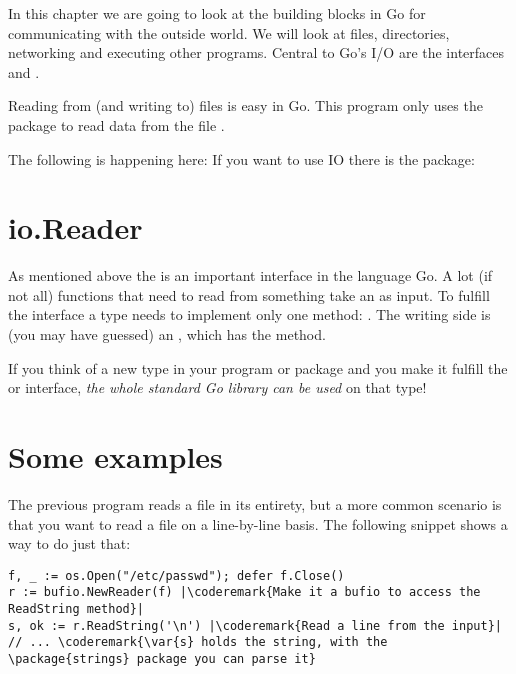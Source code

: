 \noindent{}In this chapter we are going to look at the building blocks in Go for 
communicating with the outside world. We will look at files, directories, networking
and executing other programs. Central to Go's I/O are the interfaces 
and .

Reading from (and writing to) files is easy in Go. This program
only uses the  package to read data from the file .

The following is happening here:
\showremarks
If you want to use  IO there is the
 package:

\showremarks

\section{io.Reader}
As mentioned above the  is an important interface in the language Go. A lot
(if not all) functions that need to read from something take an 
as input. To fulfill the interface a type needs to implement only one method: . The writing side is (you may have guessed) an , which has
the  method.

If you think of a new type in your program or package and you make it fulfill the 
or  interface, \emph{the whole standard Go library can be used} on that type!

\section{Some examples}
The previous program reads a file in its entirety, but a more common scenario is that
you want to read a file on a line-by-line basis. The following snippet shows a way
to do just that:

\begin{lstlisting}
f, _ := os.Open("/etc/passwd"); defer f.Close()
r := bufio.NewReader(f) |\coderemark{Make it a bufio to access the ReadString method}|
s, ok := r.ReadString('\n') |\coderemark{Read a line from the input}|
// ... \coderemark{\var{s} holds the string, with the \package{strings} package you can parse it}
\end{lstlisting}

